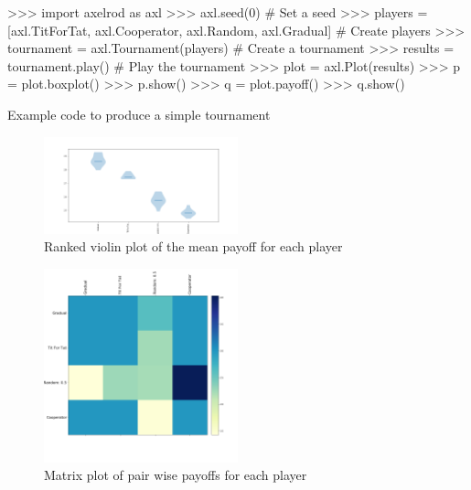 \begin{listing}[htbp!]
    \begin{ExampleCode}
>>> import axelrod as axl
>>> axl.seed(0)  # Set a seed
>>> players = [axl.TitForTat, axl.Cooperator, axl.Random, axl.Gradual]  # Create players
>>> tournament = axl.Tournament(players)  # Create a tournament
>>> results = tournament.play()  # Play the tournament
>>> plot = axl.Plot(results)
>>> p = plot.boxplot()
>>> p.show()
>>> q = plot.payoff()
>>> q.show()
    \end{ExampleCode}
    \caption{Example code to produce a simple tournament}
    \label{lst:tournament}
\end{listing}

\begin{figure}[hbtp!]
    \centering
    \includegraphics[width=0.5\textwidth]{../img/examples/small_violin.png}
    \caption{Ranked violin plot of the mean payoff for each player}
    \label{fig:violinplot}
\end{figure}

\begin{figure}
    \centering
    \includegraphics[width=0.5\textwidth]{../img/examples/small_payoff.png}
    \caption{Matrix plot of pair wise payoffs for each player}
    \label{fig:matrixplot}
\end{figure}


